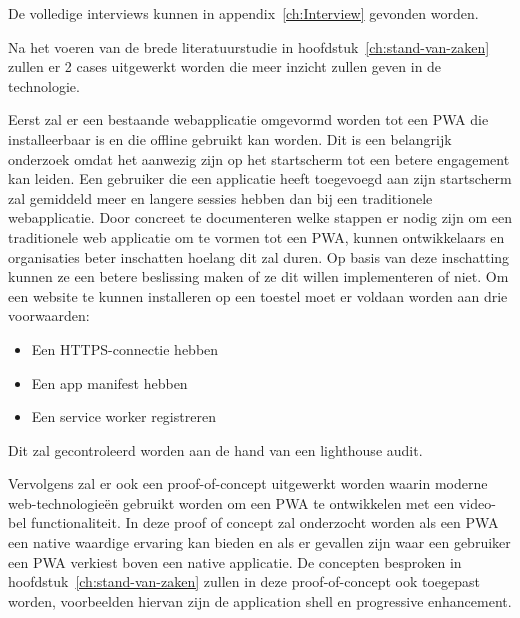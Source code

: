 De volledige interviews kunnen in appendix~\ref{ch:Interview} gevonden worden.

Na het voeren van de brede literatuurstudie in hoofdstuk~\ref{ch:stand-van-zaken} zullen er 2 cases uitgewerkt worden die meer inzicht zullen geven in de technologie.


Eerst zal er een bestaande webapplicatie omgevormd worden tot een PWA die installeerbaar is en die offline gebruikt kan worden.
Dit is een belangrijk onderzoek omdat het aanwezig zijn op het startscherm tot een betere engagement kan leiden. Een gebruiker die een applicatie heeft toegevoegd aan zijn startscherm zal gemiddeld meer en langere sessies hebben dan bij een traditionele webapplicatie.
\autocite{LePage2020b}
Door concreet te documenteren welke stappen er nodig zijn om een traditionele web applicatie om te vormen tot een PWA, kunnen ontwikkelaars en organisaties beter inschatten hoelang dit zal duren.
Op basis van deze inschatting kunnen ze een betere beslissing maken of ze dit willen implementeren of niet.
Om een website te kunnen installeren op een toestel moet er voldaan worden aan drie voorwaarden:
\begin{itemize}
	\item Een HTTPS-connectie hebben
	\item Een app manifest hebben
	\item Een service worker registreren
\end{itemize}
Dit zal gecontroleerd worden aan de hand van een lighthouse audit.
	

Vervolgens zal er ook een proof-of-concept uitgewerkt worden waarin moderne web-technologieën gebruikt worden om een PWA te ontwikkelen met een video-bel functionaliteit. In deze proof of concept zal onderzocht worden als een PWA een native waardige ervaring kan bieden en als er gevallen zijn waar een gebruiker een PWA verkiest boven een native applicatie. De concepten besproken in hoofdstuk~\ref{ch:stand-van-zaken} zullen in deze proof-of-concept ook toegepast worden, voorbeelden hiervan zijn de application shell en  progressive enhancement.

